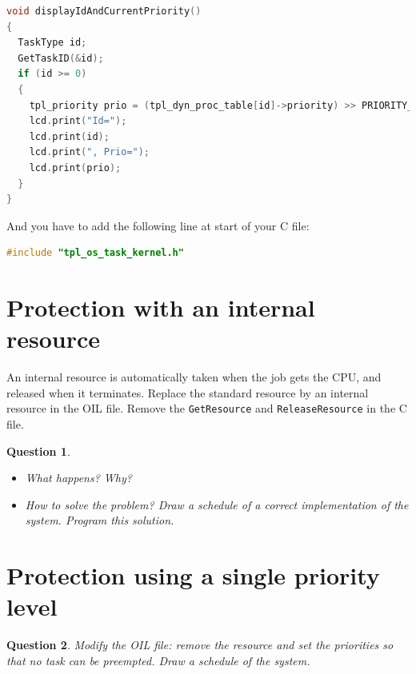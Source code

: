 \documentclass[11pt]{report}
\newtheorem{ex}{Question}
\newcommand{\unixcl}[1]{\texttt{\fcolorbox{black}{gray!20}{\footnotesize#1}}}
\begin{document}
\begin{lstlisting}[language=C]
void displayIdAndCurrentPriority()
{
  TaskType id;
  GetTaskID(&id);
  if (id >= 0)
  {
    tpl_priority prio = (tpl_dyn_proc_table[id]->priority) >> PRIORITY_SHIFT;
    lcd.print("Id=");
    lcd.print(id);
    lcd.print(", Prio=");
    lcd.print(prio);
  }
}
\end{lstlisting}

And you have to add the following line at start of your C file:

\begin{lstlisting}[language=C]
 #include "tpl_os_task_kernel.h"
\end{lstlisting}


\section{Protection with an internal resource}

An internal resource is automatically taken when the job gets the CPU, and released when it terminates. Replace the standard resource by an internal resource in the OIL file. Remove the \texttt{GetResource} and \texttt{ReleaseResource} in the C file.

\begin{ex}~
    \begin{itemize}
        \item
            What happens? Why?
        \item
            How to solve the problem? Draw a schedule of a correct implementation of the system. Program this solution.
    \end{itemize}
\end{ex}


\section{Protection using a single priority level}

\begin{ex}
Modify the OIL file: remove the resource and set the priorities so that no task
can be preempted. Draw a schedule of the system.
\end{ex}


\end{document}
